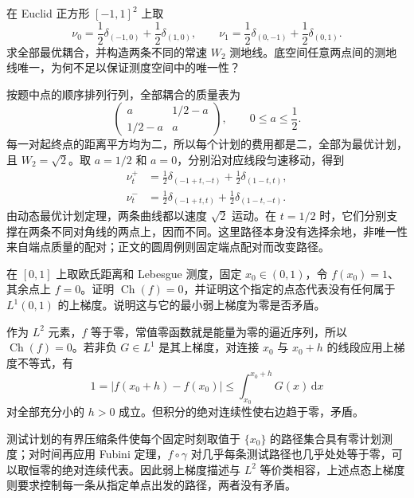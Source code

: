 \begin{exercise}\label{g3:ex:C-nonunique-plan-geodesics}
	在 Euclid 正方形 \([-1,1]^2\) 上取
	\[
		\nu_0=\frac12\delta_{(-1,0)}+\frac12\delta_{(1,0)},
		\qquad\nu_1=\frac12\delta_{(0,-1)}+\frac12\delta_{(0,1)}.
	\]
	求全部最优耦合，并构造两条不同的常速 \(W_2\) 测地线。底空间任意两点间的测地线唯一，为何不足以保证测度空间中的唯一性？
\end{exercise}
\begin{solution}
	按题中点的顺序排列行列，全部耦合的质量表为
	\[
		\begin{pmatrix}a&1/2-a\\1/2-a&a\end{pmatrix},
		\qquad0\le a\le\frac12.
	\]
	每一对起终点的距离平方均为二，所以每个计划的费用都是二，全部为最优计划，且 \(W_2=\sqrt2\)。取 \(a=1/2\) 和 \(a=0\)，分别沿对应线段匀速移动，得到
	\[
		\begin{aligned}
		\nu_t^+&=\tfrac12\delta_{(-1+t,-t)}+\tfrac12\delta_{(1-t,t)},\\
		\nu_t^-&=\tfrac12\delta_{(-1+t,t)}+\tfrac12\delta_{(1-t,-t)}.
		\end{aligned}
	\]
	由动态最优计划定理，两条曲线都以速度 \(\sqrt2\) 运动。在 \(t=1/2\) 时，它们分别支撑在两条不同对角线的两点上，因而不同。这里路径本身没有选择余地，非唯一性来自端点质量的配对；正文的圆周例则固定端点配对而改变路径。
\end{solution}

\begin{exercise}\label{g3:ex:C-point-representative}
	在 \([0,1]\) 上取欧氏距离和 Lebesgue 测度，固定 \(x_0\in(0,1)\)，令 \(f(x_0)=1\)、其余点上 \(f=0\)。证明 \(\operatorname{Ch}(f)=0\)，并证明这个指定的点态代表没有任何属于 \(L^1(0,1)\) 的上梯度。说明这与它的最小弱上梯度为零是否矛盾。
\end{exercise}
\begin{solution}
	作为 \(L^2\) 元素，\(f\) 等于零，常值零函数就是能量为零的逼近序列，所以 \(\operatorname{Ch}(f)=0\)。若非负 \(G\in L^1\) 是其上梯度，对连接 \(x_0\) 与 \(x_0+h\) 的线段应用上梯度不等式，有
	\[
		1=|f(x_0+h)-f(x_0)|\le\int_{x_0}^{x_0+h}G(x)\,\mathrm dx
	\]
	对全部充分小的 \(h>0\) 成立。但积分的绝对连续性使右边趋于零，矛盾。

	测试计划的有界压缩条件使每个固定时刻取值于 \(\{x_0\}\) 的路径集合具有零计划测度；对时间再应用 Fubini 定理，\(f\circ\gamma\) 对几乎每条测试路径也几乎处处等于零，可以取恒零的绝对连续代表。因此弱上梯度描述与 \(L^2\) 等价类相容，上述点态上梯度则要求控制每一条从指定单点出发的路径，两者没有矛盾。
\end{solution}

